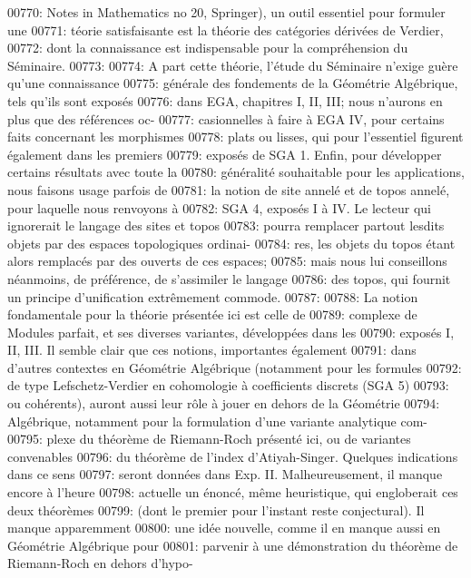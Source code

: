00770: Notes in Mathematics no 20, Springer), un outil essentiel pour formuler une
00771: t\'eorie satisfaisante est la th\'eorie des cat\'egories d\'eriv\'ees de Verdier,
00772: dont la connaissance est indispensable pour la compr\'ehension du S\'eminaire.
00773: 
00774: A part cette th\'eorie, l'\'etude du S\'eminaire n'exige gu\`ere qu'une connaissance
00775: g\'en\'erale des fondements de la G\'eom\'etrie Alg\'ebrique, tels qu'ils sont expos\'es
00776: dans EGA, chapitres I, II, III; nous n'aurons en plus que des r\'ef\'erences oc-
00777: casionnelles \`a faire \`a EGA IV, pour certains faits concernant les morphismes
00778: plats ou lisses, qui pour l'essentiel figurent \'egalement dans les premiers
00779: expos\'es de SGA 1. Enfin, pour d\'evelopper certains r\'esultats avec toute la
00780: g\'en\'eralit\'e souhaitable pour les applications, nous faisons usage parfois de
00781: la notion de site annel\'e et de topos annel\'e, pour laquelle nous renvoyons \`a
00782: SGA 4, expos\'es I \`a IV. Le lecteur qui ignorerait le langage des sites et topos
00783: pourra remplacer partout lesdits objets par des espaces topologiques ordinai-
00784: res, les objets du topos \'etant alors remplac\'es par des ouverts de ces espaces;
00785: mais nous lui conseillons n\'eanmoins, de pr\'ef\'erence, de s'assimiler le langage
00786: des topos, qui fournit un principe d'unification extr\^emement commode.
00787: 
00788: La notion fondamentale pour la th\'eorie pr\'esent\'ee ici est celle de
00789: complexe de Modules parfait, et ses diverses variantes, d\'evelopp\'ees dans les
00790: expos\'es I, II, III. Il semble clair que ces notions, importantes \'egalement
00791: dans d'autres contextes en G\'eom\'etrie Alg\'ebrique (notamment pour les formules
00792: de type Lefschetz-Verdier en cohomologie \`a coefficients discrets (SGA 5)
00793: ou coh\'erents), auront aussi leur r\^ole \`a jouer en dehors de la G\'eom\'etrie
00794: Alg\'ebrique, notamment pour la formulation d'une variante analytique com-
00795: plexe du th\'eor\`eme de Riemann-Roch pr\'esent\'e ici, ou de variantes convenables
00796: du th\'eor\`eme de l'index d'Atiyah-Singer. Quelques indications dans ce sens
00797: seront donn\'ees dans Exp. II. Malheureusement, il manque encore \`a l'heure
00798: actuelle un \'enonc\'e, m\^eme heuristique, qui engloberait ces deux th\'eor\`emes
00799: (dont le premier pour l'instant reste conjectural). Il manque apparemment
00800: une id\'ee nouvelle, comme il en manque aussi en G\'eom\'etrie Alg\'ebrique pour
00801: parvenir \`a une d\'emonstration du th\'eor\`eme de Riemann-Roch en dehors d'hypo-
